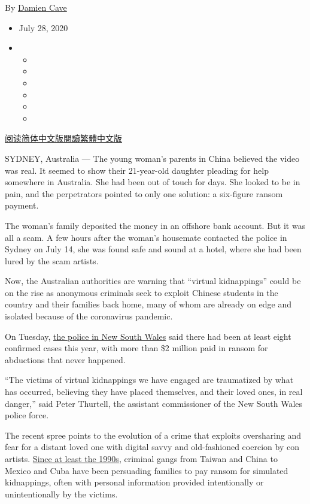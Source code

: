 By \href{https://www.nytimes.com/by/damien-cave}{Damien Cave}

\begin{itemize}
\item
  July 28, 2020
\item
  \begin{itemize}
  \item
  \item
  \item
  \item
  \item
  \item
  \end{itemize}
\end{itemize}

\href{https://cn.nytimes.com/asia-pacific/20200729/chinese-students-virtual-kidnapping/}{阅读简体中文版}\href{https://cn.nytimes.com/asia-pacific/20200729/chinese-students-virtual-kidnapping/zh-hant/}{閱讀繁體中文版}

SYDNEY, Australia --- The young woman's parents in China believed the
video was real. It seemed to show their 21-year-old daughter pleading
for help somewhere in Australia. She had been out of touch for days. She
looked to be in pain, and the perpetrators pointed to only one solution:
a six-figure ransom payment.

The woman's family deposited the money in an offshore bank account. But
it was all a scam. A few hours after the woman's housemate contacted the
police in Sydney on July 14, she was found safe and sound at a hotel,
where she had been lured by the scam artists.

Now, the Australian authorities are warning that ``virtual kidnappings''
could be on the rise as anonymous criminals seek to exploit Chinese
students in the country and their families back home, many of whom are
already on edge and isolated because of the coronavirus pandemic.

On Tuesday,
\href{https://www.facebook.com/nswpoliceforce/posts/10158124537291185}{the
police in New South Wales} said there had been at least eight confirmed
cases this year, with more than \$2 million paid in ransom for
abductions that never happened.

``The victims of virtual kidnappings we have engaged are traumatized by
what has occurred, believing they have placed themselves, and their
loved ones, in real danger,'' said Peter Thurtell, the assistant
commissioner of the New South Wales police force.

The recent spree points to the evolution of a crime that exploits
oversharing and fear for a distant loved one with digital savvy and
old-fashioned coercion by con artists.
\href{https://theconversation.com/new-virtual-kidnapping-scam-targeting-chinese-students-makes-use-of-data-shared-online-96910}{Since
at least the 1990s}, criminal gangs from Taiwan and China to Mexico and
Cuba have been persuading families to pay ransom for simulated
kidnappings, often with personal information provided intentionally or
unintentionally by the victims.

